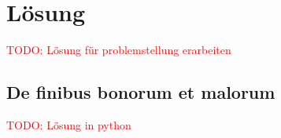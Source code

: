 %
%
%
\section{Lösung
\label{quadratur:section:loesung}}
\textcolor{red}{TODO: Lösung für problemstellung erarbeiten}

\subsection{De finibus bonorum et malorum
\label{quadratur:subsection:bonorum}}
\textcolor{red}{TODO: Lösung in python}


